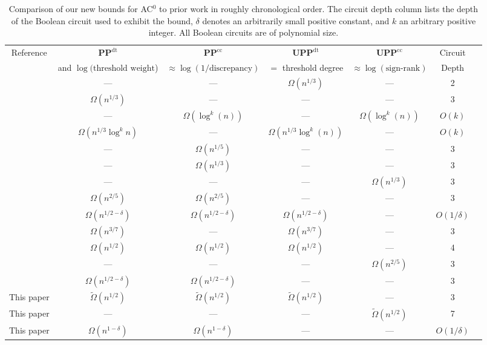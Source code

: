 \documentclass[11pt]{article}
\numberwithin{equation}{section}
\theoremstyle{definition}
\theoremstyle{plain}
\newcommand{\PP}{\mathbf{PP}}
\newcommand{\UPP}{\mathbf{UPP}}
\begin{document}
\begin{table}
	{\small
		\centering
		\setlength\tabcolsep{1.7pt}
		\begin{tabular}{|c|c|c|c|c|c|c|}
			\hline
			Reference & $\PP^{\text{dt}}$ & $\PP^{\text{cc}}$   &$\UPP^{\text{dt}}$    &  $\UPP^{\text{cc}}$ & Circuit\\
			& and $\log(\text{threshold weight}$) & $\approx \log(1/\text{discrepancy})$ & $=$ threshold degree  & $\approx \log(\text{sign-rank})$ &	Depth\\
			\hline
			\cite{mp} & --- & --- & $\Omega(n^{1/3})$ & --- & 2\\
			\hline
			\cite{kp}& $\Omega(n^{1/3})$ & ---  & --- & --- & 3 \\
			\hline
			\cite{forster} & --- & $\Omega(\log^k(n))$ & --- & $\Omega(\log^k(n))$ & $O(k)$\\
			\hline
			\cite{osnewbounds} & $\Omega(n^{1/3} \log^k n)$ & --- & $\Omega(n^{1/3} \log^k(n))$ & --- & $O(k)$\\
			\hline
			\cite{sherstovmajmaj}& --- &  $\Omega(n^{1/5})$ & --- & ---  & 3\\
			\hline
			\cite{bvdw, patmat} & --- &  $\Omega(n^{1/3})$  & ---  & --- & 3\\
			\hline
			\cite{razborovsherstov} & --- & --- & --- & $\Omega(n^{1/3})$ & 3\\
			\hline
			\cite{bt14} & $\Omega(n^{2/5})$ & $\Omega(n^{2/5})$ & --- & ---  & 3\\
			\hline
			\cite{sherstov14}&$\Omega(n^{1/2-\delta})$   & $\Omega(n^{1/2-\delta})$ 
			& $\Omega(n^{1/2-\delta})$ & ---& $O(1/\delta)$\\
			\hline
			\cite{sherstov15} & $\Omega(n^{3/7})$ & ---& $\Omega(n^{3/7})$ &--- & 3\\
			\hline
			\cite{sherstov15} & $\Omega(n^{1/2})$  & $\Omega(n^{1/2})$ & $\Omega(n^{1/2})$ &--- & 4\\
			\hline
			\cite{bt16} & --- & --- & --- & $\Omega(n^{2/5})$ & 3\\
			\hline
			\cite{dlweight} & $\Omega(n^{1/2 - \delta})$  & $\Omega(n^{1/2 - \delta})$ & ---  & --- & 3\\
			\hline %
			This paper & $\tilde{\Omega}(n^{1/2})$  &$\tilde{\Omega}(n^{1/2})$  & $\tilde{\Omega}(n^{1/2})$ & --- & 3\\
			\hline
			This paper & ---  & --- & --- & $\tilde{\Omega}(n^{1/2})$ & 7\\
			\hline
			This paper & $\Omega(n^{1 - \delta})$  & $\Omega(n^{1 - \delta})$ & ---  & --- & $O(1/\delta)$\\  %
			\hline
		\end{tabular}
		\caption{Comparison of our new bounds for AC$^0$ to prior work in roughly chronological order. The circuit depth column lists the depth of the Boolean circuit used to exhibit the bound, $\delta$ denotes an arbitrarily small positive constant, and $k$ an arbitrary positive integer. All Boolean circuits are of polynomial size.
		}
		\label{tab:tab}
	}
\end{table}
\end{document}
